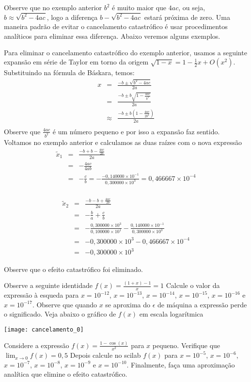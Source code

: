 Observe que no exemplo anterior $b^2$ é muito maior que $4ac$, ou seja, $b\approx \sqrt{b^2-4ac}$, logo a diferença $b-\sqrt{b^2-4ac}$ estará próxima de zero. Uma maneira padrão de evitar o cancelamento catastrófico é usar procedimentos analíticos para eliminar essa diferença. Abaixo veremos alguns exemplos.

\begin{ex}Para eliminar o cancelamento catastrófico do exemplo anterior, usamos a seguinte expansão em série de Taylor em torno da origem
$
\sqrt{1-x}=1-{\frac {1}{2}}x+O(x^2) .
$
Substituindo na fórmula de Báskara, temos:
\begin{eqnarray*}
x&=&\frac{-b\pm \sqrt{b^2-4ac}}{2a}\\
&=&\frac{-b\pm b\sqrt{1-\frac{4ac}{b^2}}}{2a}\\
&\approx&\frac{-b\pm b\left(1-\frac{4ac}{2b^2}\right)}{2a}\\
\end{eqnarray*}
Observe que $\frac{4ac}{b^2}$ é um número pequeno e por isso a expansão faz sentido. Voltamos no exemplo anterior e calculamos as duas raízes com o nova expressão
\begin{eqnarray*}
\tilde{x}_1&=& \frac{-b+ b-\frac{4ac}{2b}}{2a}\\
&=&-\frac{4ac}{4ab}\\
&=&-\frac{c}{b}=-\frac{-0,140000\times 10^{-1}}{0,300000\times 10^3}=0,466667\times 10^{-4}\\
\end{eqnarray*}

\begin{eqnarray*}
\tilde{x}_2&=& \frac{-b- b+\frac{4ac}{2b}}{2a}\\
&=& -\frac{b}{a}+\frac{c}{b}\\
&=& -\frac{0,300000\times 10^{3}}{0,100000\times 10^{1}}-\frac{0,140000\times 10^{-1}}{0,300000\times 10^3}\\
&=& -0,300000\times 10^{3}-0,466667\times 10^{-4}\\
&=& -0,300000\times 10^{3}
\end{eqnarray*}

Observe que o efeito catastrófico foi eliminado.
\end{ex}
\begin{ex}Observe a seguinte identidade
$
f(x)=\frac{(1+x)-1}{x}=1
$
Calcule o valor da expressão à esqueda para $x=10^{-12}$, $x=10^{-13}$, $x=10^{-14}$, $x=10^{-15}$, $x=10^{-16}$ e $x=10^{-17}$. Observe que quando $x$ se aproxima do $\epsilon$ de máquina a expressão perde o significado. Veja abaixo o gráfico de $f(x)$ em escala logarítmica

\texttt{[image: cancelamento\_0]}


\end{ex}
\begin{prob} Considere a expressão
$
f(x)=\frac{1-\cos(x)}{x^2}
$
para $x$ pequeno. Verifique que
$
\lim_{x\to 0}f(x)=0,5
$
Depois calcule no scilab $f(x)$ para $x=10^{-5}$, $x=10^{-6}$, $x=10^{-7}$, $x=10^{-8}$, $x=10^{-9}$ e $x=10^{-10}$. Finalmente, faça uma aproximação analítica que elimine o efeito catastrófico.
\end{prob}


